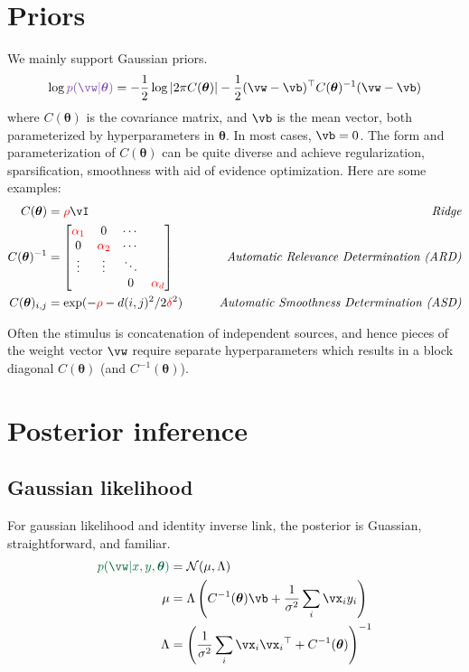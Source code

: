 \documentclass{article}
\newcounter{ct}
\newcommand{\inv}{^{-1}}
\newcommand{\trp}{{^\top}} %
\newcommand{\Gaussian}{\ensuremath{\mathcal{N}}} %
\newcommand{\weight}{\vw}
\newcommand{\hyp}{\bm{\theta}}
\newcommand{\prior}{\ensuremath{\textcolor{amethyst}{p(\weight|\hyp)}}}
\newcommand{\posterior}{\textcolor{cadmiumgreen}{p(\weight|x,y,\hyp)}}
\begin{document}
\section{Priors}
We mainly support Gaussian priors.
\begin{align}
    \log\prior =
	-\frac{1}{2}\log|2\pi C(\hyp)| 
	-\frac{1}{2}(\weight - \vb)\trp C(\hyp)\inv (\weight - \vb)
	\label{eq:prior:Gaussian}
\end{align}
where $C(\hyp)$ is the covariance matrix, and $\vb$ is the mean vector, both parameterized by hyperparameters in $\hyp$.
In most cases, $\vb = 0$.
The form and parameterization of $C(\hyp)$ can be quite diverse and achieve regularization, sparsification, smoothness with aid of evidence optimization.
Here are some examples:
\begin{align}
    C(\hyp) &= \textcolor{red}{\rho} \vI \qquad & \text{\it Ridge}
    \label{eq:prior:Ridge}
    \\
    C(\hyp)\inv &= \begin{bmatrix} 
		    \textcolor{red}{\alpha_1} & 0        & \cdots& \\
		    0        & \textcolor{red}{\alpha_2} & \cdots & \\
		    \vdots   & \vdots   & \ddots & \\
		    &          & 0      & \textcolor{red}{\alpha_d} \\
		\end{bmatrix}
	    \qquad & \text{\it Automatic Relevance Determination (ARD)}
    \label{eq:prior:ARD}
    \\
    C(\hyp)_{i,j} &= \exp(-\textcolor{red}{\rho} -d(i,j)^2/2\textcolor{red}{\delta}^2 )
	    \qquad & \text{\it Automatic Smoothness Determination (ASD)}
    \label{eq:prior:ASD}
\end{align}

Often the stimulus is concatenation of independent sources, and hence pieces of the weight vector $\weight$ require separate hyperparameters which results in a block diagonal $C(\hyp)$ (and $C\inv(\hyp)$).

\section{Posterior inference}
\subsection{Gaussian likelihood}
For gaussian likelihood and identity inverse link, the posterior is Guassian, straightforward, and familiar.
\begin{align}
    \posterior &= \Gaussian(\mu, \Lambda)
    \label{eq:posterior:Gaussian}
    \\
    \mu &= \Lambda\left(C\inv(\hyp)\vb + \frac{1}{\sigma^2}\sum_i \vx_i y_i\right)\\
    \Lambda &= \left(\frac{1}{\sigma^2}\sum_i \vx_i \vx_i\trp + C\inv(\hyp)\right)\inv
\end{align}
\end{document}

